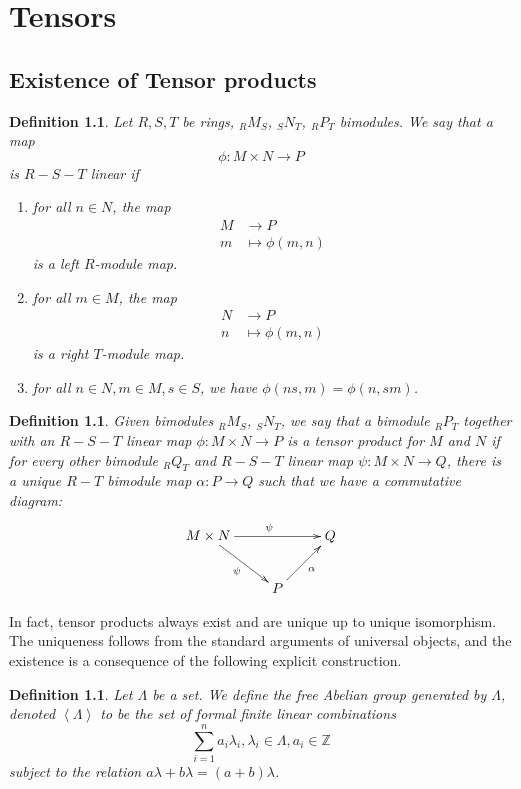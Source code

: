 \documentclass[12pt]{report}
\theoremstyle{plain}
\newtheorem{defn}[thm]{Definition}
\newcommand{\ZZ}{\mathbb{Z}}
\begin{document}
\appendix

\chapter{Tensors}


\section{Existence of Tensor products}

\begin{defn}
Let $R, S, T$ be rings, $_R M_S$, $_S N_T$, $_R P _T$ bimodules. We say
that a map
\[\phi : M \times N \to P\]
is $R-S-T$ linear if
\begin{enumerate}[1. ]
\item for all $n \in N$, the map
\begin{align*}
M &\to P \\
m &\mapsto \phi(m, n)
\end{align*}
is a left $R$-module map.
\item for all $m \in M$, the map
\begin{align*}
N &\to P \\
n &\mapsto \phi(m, n)
\end{align*}
is a right $T$-module map.
\item for all $n \in N, m \in M, s \in S$, we have $\phi(ns, m) = \phi(n,
sm)$.
\end{enumerate}
\end{defn}

\begin{defn}
Given bimodules $ _R M_S$, $_S N_T$, we say that a bimodule $ _R P_T$
together with an $R-S-T$ linear map $\phi: M \times N \to P$ is a tensor product
for $M$ and $N$ if for every other bimodule $_R Q_T$ and $R-S-T$ linear map
$\psi : M \times N \to Q$, there is a unique $R-T$ bimodule map $\alpha : P
\to Q$ such that we have a commutative diagram:
\[\xymatrix{
M \times N \ar[rd]_{\psi} \ar[rr]^\psi & & Q \\
 & P \ar[ru]_{\alpha}
}\]
\end{defn}

In fact, tensor products always exist and are unique up to unique
isomorphism. The uniqueness follows from the standard arguments of
universal objects, and the existence is a consequence of the following
explicit construction.

\begin{defn}
Let $\Lambda$ be a set. We define the free Abelian group
generated by $\Lambda$, denoted $\left<\Lambda\right>$ to be the set
of formal finite linear combinations
\[\sum_{i = 1}^n a_i \lambda_i , \lambda_i \in
\Lambda, a_i \in \ZZ \]
subject to the relation $a \lambda + b \lambda = (a + b) \lambda$.
\end{defn}
\end{document}
